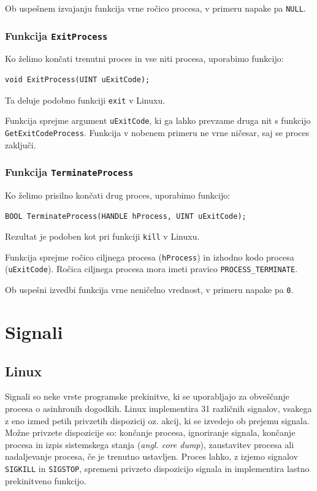 \documentclass[a4paper,12pt,openright]{book}
\begin{document}
Ob uspešnem izvajanju funkcija vrne ročico procesa, v primeru napake pa \texttt{NULL}.

\subsubsection{Funkcija \texttt{ExitProcess}}

Ko želimo končati trenutni proces in vse niti procesa, uporabimo funkcijo:
\begin{lstlisting}[style=func]
 void ExitProcess(UINT uExitCode);
\end{lstlisting}
Ta deluje podobno funkciji \texttt{exit} v Linuxu.

Funkcija sprejme argument \texttt{uExitCode}, ki ga lahko prevzame druga nit s funkcijo \texttt{GetExitCodeProcess}.
Funkcija v nobenem primeru ne vrne ničesar, saj se proces zaključi.

\subsubsection{Funkcija \texttt{TerminateProcess}}

Ko želimo prisilno končati drug proces, uporabimo funkcijo:
\begin{lstlisting}[style=func]
 BOOL TerminateProcess(HANDLE hProcess, UINT uExitCode);
\end{lstlisting}
Rezultat je podoben kot pri funkciji \texttt{kill} v Linuxu.

Funkcija sprejme ročico ciljnega procesa (\texttt{hProcess}) in izhodno kodo procesa (\texttt{uExitCode}).
Ročica ciljnega procesa mora imeti pravico \texttt{PROCESS\-\_TERMINATE}.

Ob uspešni izvedbi funkcija vrne neničelno vrednost, v primeru napake pa \texttt{0}.

\section{Signali}

\subsection{Linux}

Signali so neke vrste programske prekinitve, ki se uporabljajo za obveščanje procesa o asinhronih dogodkih. %
Linux implementira 31 različnih signalov, vsakega z eno izmed petih privzetih dispozicij oz. akcij, ki se izvedejo ob prejemu signala.
Možne privzete dispozicije so: končanje procesa, ignoriranje signala, končanje procesa in izpis sistemskega stanja (\textit{angl. core dump}), zaustavitev procesa ali nadaljevanje procesa, če je trenutno ustavljen.
Proces lahko, z izjemo signalov \texttt{SIGKILL} in \texttt{SIGSTOP}, spremeni privzeto dispozicijo signala in implementira lastno prekinitveno funkcijo.
\end{document}
